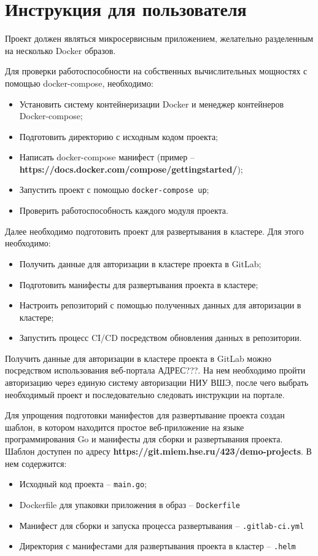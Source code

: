 \chapter{Инструкция для пользователя}
\label{cha:app:user}

Проект должен являться микросервисным приложением, желательно разделенным на несколько Docker образов.

Для проверки работоспособности на собственных вычислительных мощностях с помощью docker-compose, необходимо:
\begin{itemize}
    \item Установить систему контейнеризации Docker и менеджер контейнеров Docker-compose;
    \item Подготовить директорию с исходным кодом проекта;
    \item Написать docker-compose манифест (пример -- \textbf{https://docs.docker.com/compose/gettingstarted/});
    \item Запустить проект с помощью \texttt{docker-compose up};
    \item Проверить работоспособность каждого модуля проекта.
\end{itemize}

Далее необходимо подготовить проект для развертывания в кластере. Для этого необходимо:
\begin{itemize}
    \item Получить данные для авторизации в кластере проекта в GitLab;
    \item Подготовить манифесты для развертывания проекта в кластере;
    \item Настроить репозиторий с помощью полученных данных для авторизации в кластере;
    \item Запустить процесс CI/CD посредством обновления данных в репозитории.
\end{itemize}

Получить данные для авторизации в кластере проекта в GitLab можно посредством использования веб-портала АДРЕС???. На нем необходимо пройти авторизацию через единую систему авторизации НИУ ВШЭ, после чего выбрать необходимый проект и последовательно следовать инструкции на портале.

Для упрощения подготовки манифестов для развертывание проекта создан шаблон, в котором находится простое веб-приложение на языке программирования Go и манифесты для сборки и развертывания проекта. Шаблон доступен по адресу \textbf{https://git.miem.hse.ru/423/demo-projects}. В нем содержится:
\begin{itemize}
    \item Исходный код проекта -- \texttt{main.go};
    \item Dockerfile для упаковки приложения в образ -- \texttt{Dockerfile}
    \item Манифест для сборки и запуска процесса развертывания -- \texttt{.gitlab-ci.yml}
    \item Директория с манифестами для развертывания проекта в кластер -- \texttt{.helm}
\end{itemize}

